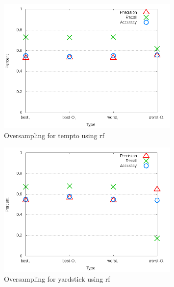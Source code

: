 \clearpage
\begin{figure}[!t]
\centering
\includegraphics[width=0.8\textwidth]{images/rf/test_4/tempto_sample_range.png}
\caption{Oversampling for tempto using \gls{rf}}
\label{fig:test_4_tempto_rf}
\end{figure}

\begin{figure}[!t]
\centering
\includegraphics[width=0.8\textwidth]{images/rf/test_4/yardstick_sample_range.png}
\caption{Oversampling for yardstick using \gls{rf}}
\label{fig:test_4_yardstick_rf}
\end{figure}

